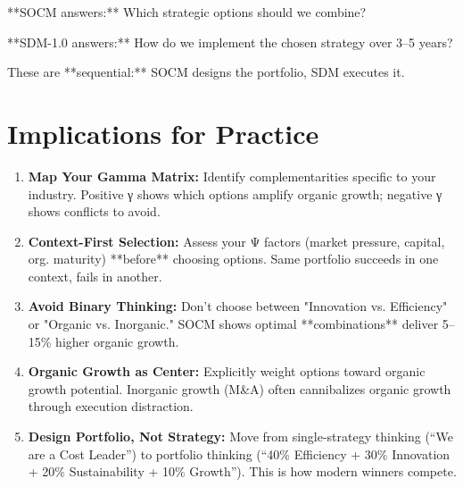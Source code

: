 \begin{tcolorbox}[colback=yellow!5!white, colframe=yellow!75!black,
    title=Relationship: SOCM $\leftrightarrow$ SDM-1.0 (Implementation)]

**SOCM answers:** Which strategic options should we combine?

**SDM-1.0 answers:** How do we implement the chosen strategy over 3--5 years?

These are **sequential:** SOCM designs the portfolio, SDM executes it.

\end{tcolorbox}


\section{Implications for Practice}
\label{sec:socm-practice}

\begin{tcolorbox}[colback=green!5!white, colframe=green!75!black,
    title=Practical Implications for Strategy Design]

\begin{enumerate}

\item \textbf{Map Your Gamma Matrix:} Identify complementarities specific to your industry. Positive γ shows which options amplify organic growth; negative γ shows conflicts to avoid.

\item \textbf{Context-First Selection:} Assess your Ψ factors (market pressure, capital, org. maturity) **before** choosing options. Same portfolio succeeds in one context, fails in another.

\item \textbf{Avoid Binary Thinking:} Don't choose between "Innovation vs. Efficiency" or "Organic vs. Inorganic." SOCM shows optimal **combinations** deliver 5--15\% higher organic growth.

\item \textbf{Organic Growth as Center:} Explicitly weight options toward organic growth potential. Inorganic growth (M\&A) often cannibalizes organic growth through execution distraction.

\item \textbf{Design Portfolio, Not Strategy:} Move from single-strategy thinking (``We are a Cost Leader'') to portfolio thinking (``40\% Efficiency + 30\% Innovation + 20\% Sustainability + 10\% Growth''). This is how modern winners compete.

\end{enumerate}

\end{tcolorbox}

